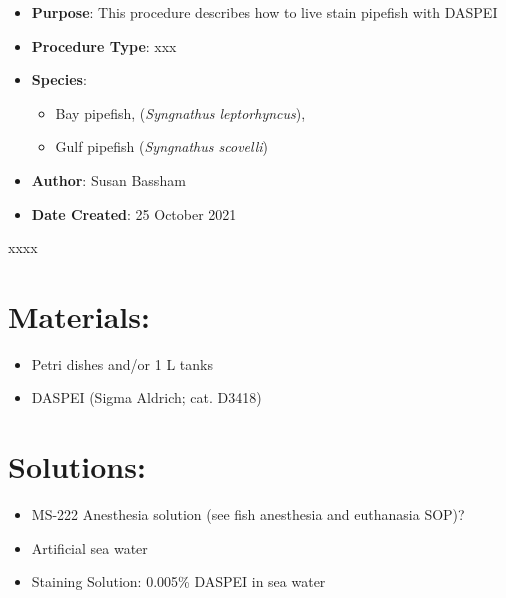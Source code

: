 \documentclass[
  letterpaper,
  DIV=11,
  numbers=noendperiod]{scrreprt}
\providecommand{\tightlist}{%
  \setlength{\itemsep}{0pt}\setlength{\parskip}{0pt}}\usepackage{longtable,booktabs,array}
\begin{document}
\begin{itemize}
\tightlist
\item
  \textbf{Purpose}: This procedure describes how to live stain pipefish
  with DASPEI
\item
  \textbf{Procedure Type}: xxx
\item
  \textbf{Species}:

  \begin{itemize}
  \tightlist
  \item
    Bay pipefish, (\emph{Syngnathus leptorhyncus}),
  \item
    Gulf pipefish (\emph{Syngnathus scovelli})
  \end{itemize}
\item
  \textbf{Author}: Susan Bassham
\item
  \textbf{Date Created}: 25 October 2021
\end{itemize}

\begin{tcolorbox}[enhanced jigsaw, rightrule=.15mm, title=\textcolor{quarto-callout-warning-color}{\faExclamationTriangle}\hspace{0.5em}{xxxx}, titlerule=0mm, opacitybacktitle=0.6, toprule=.15mm, bottomrule=.15mm, opacityback=0, left=2mm, colframe=quarto-callout-warning-color-frame, breakable, coltitle=black, colback=white, colbacktitle=quarto-callout-warning-color!10!white, bottomtitle=1mm, leftrule=.75mm, toptitle=1mm, arc=.35mm]

xxxx

\end{tcolorbox}

\hypertarget{materials-61}{%
\section{Materials:}\label{materials-61}}

\begin{itemize}
\tightlist
\item
  Petri dishes and/or 1 L tanks
\item
  DASPEI (Sigma Aldrich; cat. D3418)
\end{itemize}

\hypertarget{solutions-52}{%
\section{Solutions:}\label{solutions-52}}

\begin{itemize}
\tightlist
\item
  MS-222 Anesthesia solution (see fish anesthesia and euthanasia SOP)?
\item
  Artificial sea water\\
\item
  Staining Solution: 0.005\% DASPEI in sea water
\end{itemize}
\end{document}
